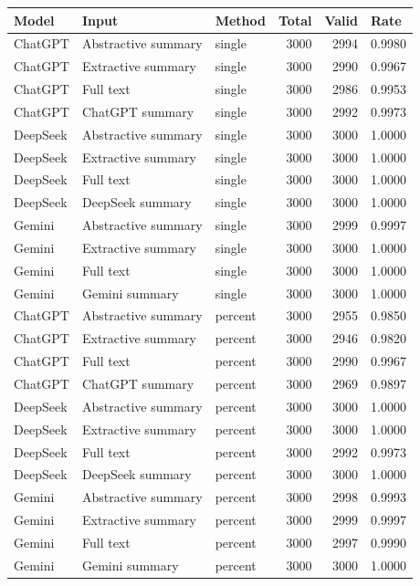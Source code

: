 \begin{tabular}{lllrrl}
\toprule
Model & Input & Method & Total & Valid & Rate \\
\midrule
ChatGPT & Abstractive summary & single & 3000 & 2994 & 0.9980 \\
ChatGPT & Extractive summary & single & 3000 & 2990 & 0.9967 \\
ChatGPT & Full text & single & 3000 & 2986 & 0.9953 \\
ChatGPT & ChatGPT summary & single & 3000 & 2992 & 0.9973 \\
DeepSeek & Abstractive summary & single & 3000 & 3000 & 1.0000 \\
DeepSeek & Extractive summary & single & 3000 & 3000 & 1.0000 \\
DeepSeek & Full text & single & 3000 & 3000 & 1.0000 \\
DeepSeek & DeepSeek summary & single & 3000 & 3000 & 1.0000 \\
Gemini & Abstractive summary & single & 3000 & 2999 & 0.9997 \\
Gemini & Extractive summary & single & 3000 & 3000 & 1.0000 \\
Gemini & Full text & single & 3000 & 3000 & 1.0000 \\
Gemini & Gemini summary & single & 3000 & 3000 & 1.0000 \\
ChatGPT & Abstractive summary & percent & 3000 & 2955 & 0.9850 \\
ChatGPT & Extractive summary & percent & 3000 & 2946 & 0.9820 \\
ChatGPT & Full text & percent & 3000 & 2990 & 0.9967 \\
ChatGPT & ChatGPT summary & percent & 3000 & 2969 & 0.9897 \\
DeepSeek & Abstractive summary & percent & 3000 & 3000 & 1.0000 \\
DeepSeek & Extractive summary & percent & 3000 & 3000 & 1.0000 \\
DeepSeek & Full text & percent & 3000 & 2992 & 0.9973 \\
DeepSeek & DeepSeek summary & percent & 3000 & 3000 & 1.0000 \\
Gemini & Abstractive summary & percent & 3000 & 2998 & 0.9993 \\
Gemini & Extractive summary & percent & 3000 & 2999 & 0.9997 \\
Gemini & Full text & percent & 3000 & 2997 & 0.9990 \\
Gemini & Gemini summary & percent & 3000 & 3000 & 1.0000 \\
\bottomrule
\end{tabular}

